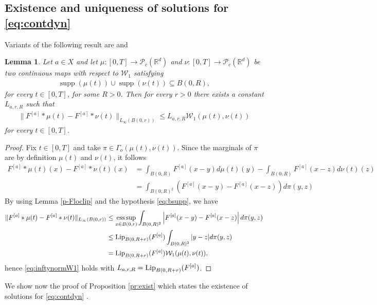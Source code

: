 \documentclass[A4paper,11pt]{article}
\newtheorem{lemma}[theorem]{Lemma}
\theoremstyle{definition}
\newcommand{\Lip}{\textup{Lip}}
\newcommand{\R}{\mathbb{R}}
\newcommand{\W}{\mathcal{W}}
\DeclareMathOperator{\supp}{supp}
\DeclareMathOperator*{\esssup}{ess\,sup}
\newcommand{\Fun}[1]{F^{[#1]}}
\begin{document}
\subsection{Existence and uniqueness of solutions  for  \eqref{eq:contdyn} }\label{ap3}



Variants of the following result are \cite[Lemma 6.7]{MFOC} and \cite[Lemma 4.7]{CanCarRos10}

\begin{lemma}\label{p-lipkernel}
Let $a \in X$ and let $\mu:[0,T] \rightarrow \mathcal{P}_c(\R^d)$ and $\nu: [0,T] \to \mathcal{P}_c(\R^d)$ be two continuous maps with respect to $\W_1$ satisfying
\begin{align}\label{eq:bsupp}
\supp(\mu(t)) \cup \supp(\nu(t)) \subseteq B(0,R),
\end{align}
for every $t \in [0,T]$, for some $R > 0$. Then for every $r > 0$ there exists a constant $L_{a,r,R}$ such that
\begin{align}\label{eq:inftynormW1}
\|\Fun{a} * \mu(t) - \Fun{a} * \nu(t)\|_{L_{\infty}(B(0,r))} \leq L_{a,r,R} \W_1(\mu(t),\nu(t))
\end{align}
for every $t \in [0,T]$.
\end{lemma}
\begin{proof}
Fix $t \in [0,T]$ and take $\pi \in \Gamma_o(\mu(t),\nu(t))$. Since the marginals of $\pi$ are by definition $\mu(t)$ and $\nu(t)$, it follows
\begin{align*}
\Fun{a} * \mu(t)(x) - \Fun{a} * \nu(t)(x) &= \int_{B(0,R)} \Fun{a}(x-y) d\mu(t)(y) - \int_{B(0,R)} \Fun{a}(x-z) d\nu(t)(z)  \\
&= \int_{B(0,R)^2} \left(\Fun{a}(x-y) - \Fun{a}(x-z)\right) d\pi(y,z)
\end{align*}
By using Lemma \ref{p-Floclip} and the hypothesis \eqref{eq:bsupp}, we have
\begin{align*}
\|\Fun{a} * \mu(t) - \Fun{a} * \nu(t)\|_{L_{\infty}(B(0,r))} &\leq \esssup_{x \in B(0,r)} \int_{B(0,R)^2} \left|\Fun{a}(x-y) - \Fun{a}(x-z)\right| d\pi(y,z) \\
&\leq \Lip_{B(0,R+r)}(\Fun{a}) \int_{B(0,R)^2} |y - z| d\pi(y,z) \\
&= \Lip_{B(0,R+r)}(\Fun{a}) \W_1(\mu(t),\nu(t)),
\end{align*}
hence \eqref{eq:inftynormW1} holds with $L_{a,r,R} = \Lip_{B(0,R+r)}(\Fun{a})$.
\end{proof}

We show now the proof of Proposition \ref{pr:exist} which states the existence of solutions for \eqref{eq:contdyn} .
\end{document}
